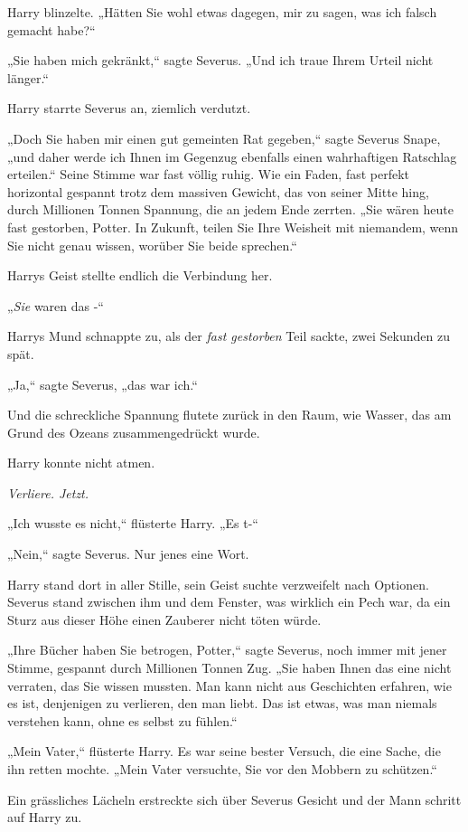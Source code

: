 {Harry blinzelte. „Hätten Sie wohl etwas dagegen, mir zu sagen, was ich falsch gemacht habe?“

„Sie haben mich gekränkt,“ sagte Severus. „Und ich traue Ihrem Urteil nicht länger.“

Harry starrte Severus an, ziemlich verdutzt.

„Doch Sie haben mir einen gut gemeinten Rat gegeben,“ sagte Severus Snape, „und daher werde ich Ihnen im Gegenzug ebenfalls einen wahrhaftigen Ratschlag erteilen.“ Seine Stimme war fast völlig ruhig. Wie ein Faden, fast perfekt horizontal gespannt trotz dem massiven Gewicht, das von seiner Mitte hing, durch Millionen Tonnen Spannung, die an jedem Ende zerrten. „Sie wären heute fast gestorben, Potter. In Zukunft, teilen Sie Ihre Weisheit mit niemandem, wenn Sie nicht genau wissen, worüber Sie beide sprechen.“

Harrys Geist stellte endlich die Verbindung her.

„\emph{Sie} waren das -“

Harrys Mund schnappte zu, als der \emph{fast gestorben} Teil sackte, zwei Sekunden zu spät.

„Ja,“ sagte Severus, „das war ich.“

Und die schreckliche Spannung flutete zurück in den Raum, wie Wasser, das am Grund des Ozeans zusammengedrückt wurde.

Harry konnte nicht atmen.

\emph{Verliere. Jetzt.}

„Ich wusste es nicht,“ flüsterte Harry. „Es t-“

„Nein,“ sagte Severus. Nur jenes eine Wort.

Harry stand dort in aller Stille, sein Geist suchte verzweifelt nach Optionen. Severus stand zwischen ihm und dem Fenster, was wirklich ein Pech war, da ein Sturz aus dieser Höhe einen Zauberer nicht töten würde.

„Ihre Bücher haben Sie betrogen, Potter,“ sagte Severus, noch immer mit jener Stimme, gespannt durch Millionen Tonnen Zug. „Sie haben Ihnen das eine nicht verraten, das Sie wissen mussten. Man kann nicht aus Geschichten erfahren, wie es ist, denjenigen zu verlieren, den man liebt. Das ist etwas, was man niemals verstehen kann, ohne es selbst zu fühlen.“

„Mein Vater,“ flüsterte Harry. Es war seine bester Versuch, die eine Sache, die ihn retten mochte. „Mein Vater versuchte, Sie vor den Mobbern zu schützen.“

Ein grässliches Lächeln erstreckte sich über Severus Gesicht und der Mann schritt auf Harry zu.

}

